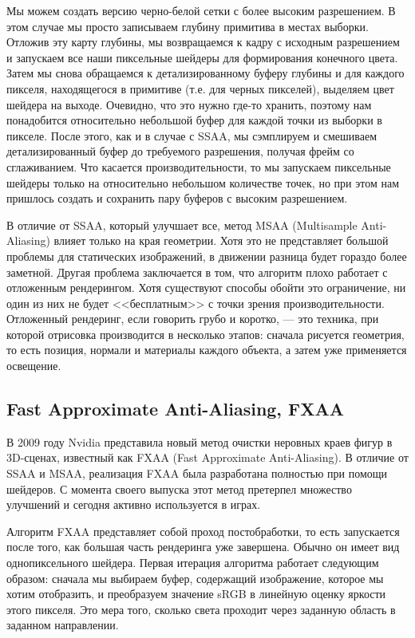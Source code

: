 Мы можем создать версию черно-белой сетки с более высоким разрешением. В этом случае мы просто записываем глубину примитива в местах выборки. Отложив эту карту глубины, мы возвращаемся к кадру с исходным разрешением и запускаем все наши пиксельные шейдеры для формирования конечного цвета. Затем мы снова обращаемся к детализированному буферу глубины и для каждого пикселя, находящегося в примитиве (т.е. для черных пикселей), выделяем цвет шейдера на выходе. Очевидно, что это нужно где-то хранить, поэтому нам понадобится относительно небольшой буфер для каждой точки из выборки в пикселе. После этого, как и в случае с SSAA, мы сэмплируем и смешиваем детализированный буфер до требуемого разрешения, получая фрейм со сглаживанием. Что касается производительности, то мы запускаем пиксельные шейдеры только на относительно небольшом количестве точек, но при этом нам пришлось создать и сохранить пару буферов с высоким разрешением.

В отличие от SSAA, который улучшает все, метод MSAA (Multisample Anti-Aliasing) влияет только на края геометрии. Хотя это не представляет большой проблемы для статических изображений, в движении разница будет гораздо более заметной. Другая проблема заключается в том, что алгоритм плохо работает с отложенным рендерингом. Хотя существуют способы обойти это ограничение, ни один из них не будет <<бесплатным>> с точки зрения производительности. Отложенный рендеринг, если говорить грубо и коротко, — это техника, при которой отрисовка производится в несколько этапов: сначала рисуется геометрия, то есть позиция, нормали и материалы каждого объекта, а затем уже применяется освещение.

\subsection{Fast Approximate Anti-Aliasing, FXAA}
В 2009 году Nvidia представила новый метод очистки неровных краев фигур в 3D-сценах, известный как FXAA (Fast Approximate Anti-Aliasing). В отличие от SSAA и MSAA, реализация FXAA была разработана полностью при помощи шейдеров. С момента своего выпуска этот метод претерпел множество улучшений и сегодня активно используется в играх.

Алгоритм FXAA представляет собой проход постобработки, то есть запускается после того, как большая часть рендеринга уже завершена. Обычно он имеет вид однопиксельного шейдера. Первая итерация алгоритма работает следующим образом: сначала мы выбираем буфер, содержащий изображение, которое мы хотим отобразить, и преобразуем значение sRGB в линейную оценку яркости этого пикселя. Это мера того, сколько света проходит через заданную область в заданном направлении.

